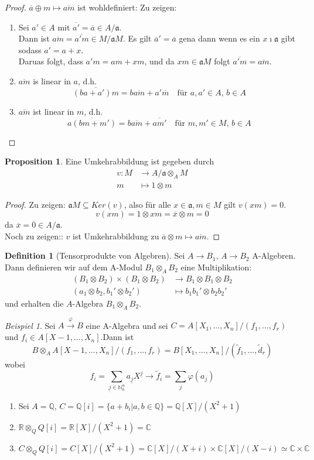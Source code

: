 \documentclass[10pt,a4paper]{article}
\newcommand{\N}{\ensuremath{\mathbb{N}}}
\newcommand{\Q}{\ensuremath{\mathbb{Q}}}
\newcommand{\R}{\ensuremath{\mathbb{R}}}
\newcommand{\C}{\ensuremath{\mathbb{C}}}
\newcommand{\ol}[1]{\overline{#1}}
\newcommand{\ul}[1]{\underline{#1}}
\newcounter{thm}[section]
\theoremstyle{definition}
\newtheorem{definition}[thm]{Definition}
\newtheorem{prop}[thm]{Proposition}
\theoremstyle{plain}
\theoremstyle{remark}
\newtheorem{exm}[thm]{Beispiel}
\begin{document}
\begin{proof}$\ol a\oplus m\mapsto \ol{am}$ ist wohldefiniert:
	Zu zeigen:
	\begin{enumerate}
		\item Sei $a'\in A$ mit $\ol{a'}=\ol a\in A/\mathfrak a$.\\
		Dann ist $\ol{am}=\ol{a'm}\in M/\mathfrak aM$.
		Es gilt $\ol{a}'=\ol a$ gena dann wenn es ein $x\imath\mathfrak a$ gibt sodass $a'=a+x$.\\
		Daruas folgt, dass $a'm=am+xm$, und da $xm\in\mathfrak aM$ folgt $\ol{a'm}=\ol{am}$.
		\item $\ol{am}$ is linear in $a$, d.h.
		\[\ol{(ba+a')m}=b\ol{am}+a'\ol m \quad \text{für $a,a'\in A$, $b\in A$}\]
		\item $\ol{am}$ ist linear in $m$, d.h.
		\[\ol{a(bm+m')}=b\ol{am}+\ol{am'}\quad\text{für $m,m'\in M$, $b\in A$}\]
	\end{enumerate}
\end{proof}
\begin{prop}
	Eine Umkehrabbildung ist gegeben durch
	\begin{align*}
	v:M&\rightarrow A/\mathfrak a\otimes_A M\\
	m&\mapsto 1\otimes m
	\end{align*}
\end{prop}
\begin{proof}
	Zu zeigen: $\mathfrak aM\subseteq Ker(v)$, also für alle $x\in\mathfrak a,m\in M$ gilt $v(xm)=0$.
	\[v(xm)=1\otimes xm=\ol{x}\otimes m=0\]
	da $\ol{x}=\ol{0}\in A/\mathfrak a$.\\
	Noch zu zeigen:: $v$ ist Umkehrabbildung zu $\ol a\otimes m\mapsto \ol{am}$.
\end{proof}
\begin{definition}[Tensorprodukte von Algebren]
	Sei $A\rightarrow  B_1$, $A\rightarrow  B_2$ A-Algebren.\\
	Dann definieren wir auf dem A-Modul $B_1\otimes_A B_2$ eine Multiplikation:
	\begin{align*}
	(B_1\otimes B_2)\times(B_1\otimes B_2)&\rightarrow B_1\otimes B_1\otimes B_2\\
	(a_1\otimes b_2,b_1'\otimes b_2')&\mapsto b_1b_1'\otimes b_2b_2'
	\end{align*}
	und erhalten die $A$-Algebra $B_1\otimes_A B_2$.
\end{definition}
\begin{exm}
	Sei $A\xrightarrow{\varphi} B$ eine A-Algebra und sei $C=A[X_1,...,X_n]/(f_1,...,f_r)$ und $f_i\in A[X-1,...,X_n]$.Dann ist
	\[B\otimes_A A[X-1,...,X_n]/(f_1,...,f_r)=B[X_1,...,X_n]/(\tilde{f}_1,...,\tilde{d}_r)\]
	wobei 
	\[f_i=\sum_{\ul{j}\in \N_0^n}a_{\ul{j}}X^{\ul{j}}\rightarrow \tilde{f}_i=\sum_j\varphi(a_j)\]
	\begin{enumerate}
		\item Sei $A=\Q$, $C=\Q[i]=\{a+b_i|a,b\in\Q\}=\Q[X]/(X^2+1)$
		\item $\R\otimes_Q Q[i]=\R[X]/(X^2+1)=\C$
		\item $C\otimes_Q Q[i]=C[X]/(X^2+1)=\C[X]/(X+i)\times\C[X]/(X-i)\simeq\C\times\C$
	\end{enumerate}
\end{exm}
\end{document}

